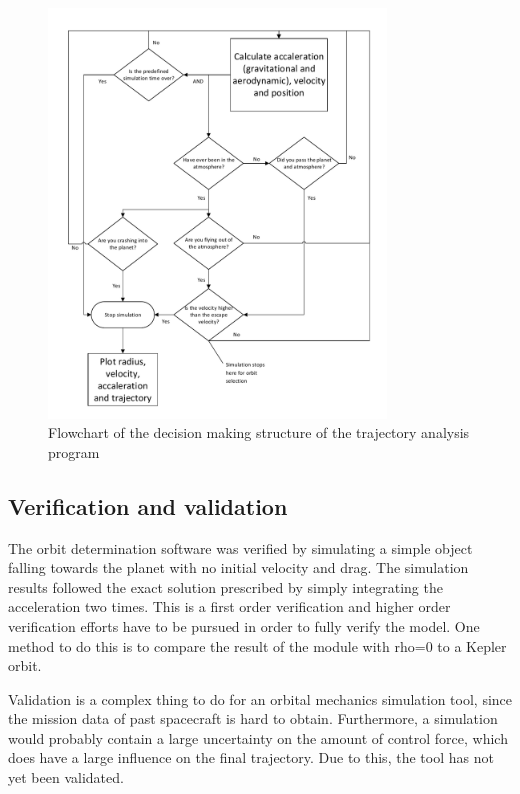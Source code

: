 \begin{figure}[H]
\centering
\hspace{-23mm}
\includegraphics[width = 0.8\textwidth]{Figure/astro_tool.pdf}
\vspace{-5mm}
\caption{Flowchart of the decision making structure of the trajectory analysis program}
\label{fig:traj_flow}
\end{figure}

\subsection{Verification and validation}
The orbit determination software was verified by simulating a simple object falling towards the planet with no initial velocity and drag. The simulation results followed the exact solution prescribed by simply integrating the acceleration two times. This is a first order verification and higher order verification efforts have to be pursued in order to fully verify the model. One method to do this is to compare the result of the module with \gls{rho}=0 to a Kepler orbit.

Validation is a complex thing to do for an orbital mechanics simulation tool, since the mission data of past spacecraft is hard to obtain. Furthermore, a simulation would probably contain a large uncertainty on the amount of control force, which does have a large influence on the final trajectory. Due to this, the tool has not yet been validated.

